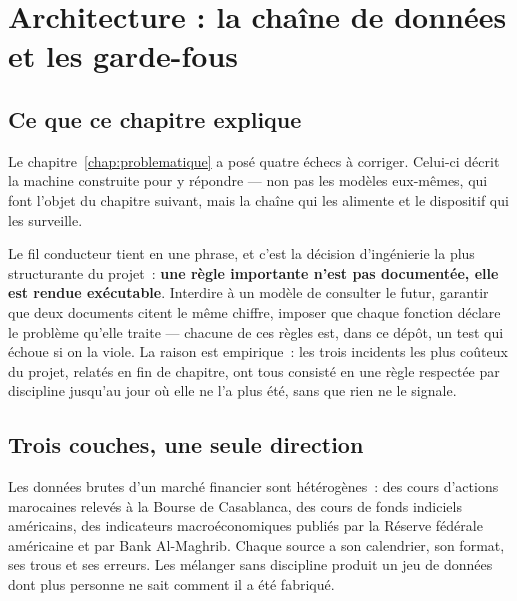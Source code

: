 %

\chapter{Architecture : la chaîne de données et les garde-fous}
\label{chap:architecture}

\section*{Ce que ce chapitre explique}

Le chapitre~\ref{chap:problematique} a posé quatre échecs à corriger. Celui-ci
décrit la machine construite pour y répondre — non pas les modèles eux-mêmes,
qui font l'objet du chapitre suivant, mais la chaîne qui les alimente et le
dispositif qui les surveille.

Le fil conducteur tient en une phrase, et c'est la décision d'ingénierie la plus
structurante du projet~: \textbf{une règle importante n'est pas documentée, elle
est rendue exécutable}. Interdire à un modèle de consulter le futur, garantir que
deux documents citent le même chiffre, imposer que chaque fonction déclare le
problème qu'elle traite — chacune de ces règles est, dans ce dépôt, un test qui
échoue si on la viole. La raison est empirique~: les trois incidents les plus
coûteux du projet, relatés en fin de chapitre, ont tous consisté en une règle
respectée par discipline jusqu'au jour où elle ne l'a plus été, sans que rien ne
le signale.

\section{Trois couches, une seule direction}

Les données brutes d'un marché financier sont hétérogènes~: des cours d'actions
marocaines relevés à la Bourse de Casablanca, des cours de fonds indiciels
américains, des indicateurs macroéconomiques publiés par la Réserve fédérale
américaine et par Bank Al-Maghrib. Chaque source a son calendrier, son format,
ses trous et ses erreurs. Les mélanger sans discipline produit un jeu de données
dont plus personne ne sait comment il a été fabriqué.

